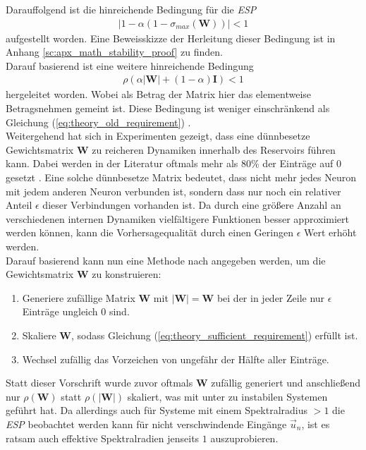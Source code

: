 Darauffolgend ist die hinreichende Bedingung für die \textit{ESP}
\begin{align}
\label{eq:theory_old_requirement}
|1-\alpha(1-\sigma_{max}(\mathbf{W}))| < 1
\end{align}
aufgestellt worden. Eine Beweisskizze der Herleitung dieser Bedingung ist in Anhang \ref{sc:apx_math_stability_proof} zu finden.\\

Darauf basierend ist eine weitere hinreichende Bedingung
\begin{align}
\label{eq:theory_sufficient_requirement}
\rho(\alpha |\mathbf{W}|+(1-\alpha) \mathbf{I}) < 1
\end{align}
hergeleitet worden. Wobei als Betrag der Matrix hier das elementweise Betragsnehmen gemeint ist. Diese Bedingung ist weniger einschränkend als Gleichung (\ref{eq:theory_old_requirement}) \cite{yildiz}.\\


Weitergehend hat sich in Experimenten gezeigt, dass eine dünnbesetze Gewichtsmatrix $\mathbf{W}$ zu reicheren Dynamiken innerhalb des Reservoirs führen kann. Dabei werden in der Literatur oftmals mehr als $80\%$ der Einträge auf $0$ gesetzt \citep{jaeger2010}. Eine solche dünnbesetze Matrix bedeutet, dass nicht mehr jedes Neuron mit jedem anderen Neuron verbunden ist, sondern dass nur noch ein relativer Anteil $\epsilon$ dieser Verbindungen vorhanden ist. Da durch eine größere Anzahl an verschiedenen internen Dynamiken vielfältigere Funktionen besser approximiert werden können, kann die Vorhersagequalität durch einen Geringen $\epsilon$ Wert erhöht werden.\\

Darauf basierend kann nun eine Methode nach \cite{yildiz} angegeben werden, um die Gewichtsmatrix $\mathbf{W}$ zu konstruieren:

\singlespacing
\begin{enumerate}
	\item Generiere zufällige Matrix $\mathbf{W}$ mit $\mathbf{|W|} = \mathbf{W}$ bei der in jeder Zeile nur $\epsilon$ Einträge ungleich $0$ sind.
	\item Skaliere $\mathbf{W}$, sodass Gleichung (\ref{eq:theory_sufficient_requirement}) erfüllt ist.
	\item Wechsel zufällig das Vorzeichen von ungefähr der Hälfte aller Einträge.
\end{enumerate}
\onehalfspacing

Statt dieser Vorschrift wurde zuvor oftmals $\mathbf{W}$ zufällig generiert und anschließend nur $\rho(\mathbf{W})$ statt $\rho(|\mathbf{W}|)$ skaliert, was mit unter zu instabilen Systemen geführt hat. Da allerdings auch für Systeme mit einem Spektralradius $ > 1$ die \textit{ESP} beobachtet werden kann für nicht verschwindende Eingänge $\vec{u}_n$, ist es ratsam auch effektive Spektralradien jenseits $1$ auszuprobieren.\\

